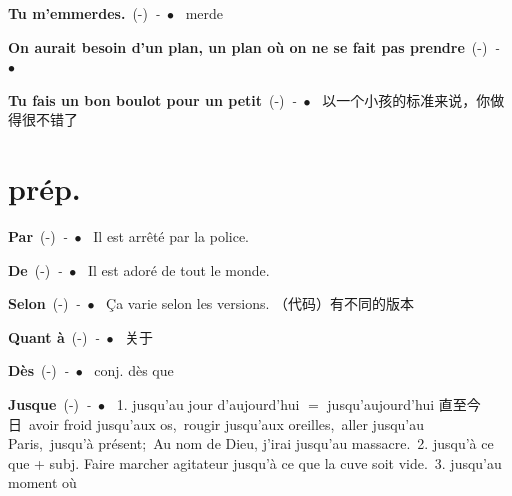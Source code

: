 \documentclass[10pt,a4paper,twoside]{article} %
\newcommand{\entry}[4]{\textbf{#1}\ {(#2)}\ \textit{#3}\ $\bullet$\ {#4}} %
\begin{document}
\begin{CJK*}{UTF8}{gkai}
\begin{multicols}{2}
\entry{Tu m'emmerdes.}{-}{-}
{
merde
}

\entry{On aurait besoin d'un plan, un plan o\`u on ne se fait pas prendre}{-}{-}
{
}

\entry{Tu fais un bon boulot pour un petit}{-}{-}
{
以一个小孩的标准来说，你做得很不错了
}

\end{multicols}


\section*{prép.}

\begin{multicols}{2}

\entry{Par}{-}{-}
{
Il est arrêté par la police.
}

\entry{De}{-}{-}
{
Il est adoré de tout le monde.
}

\entry{Selon}{-}{-}
{
Ça varie selon les versions. （代码）有不同的版本
}

\entry{Quant à}{-}{-}
{
关于
}

\entry{Dès}{-}{-}
{
conj. dès que 
}

\entry{Jusque}{-}{-}
{
1. jusqu'au jour d'aujourd'hui $=$ jusqu'aujourd'hui 直至今日\ 
avoir froid jusqu'aux os,\ rougir jusqu'aux oreilles,\ aller jusqu'au Paris,\ jusqu'à présent;\
Au nom de Dieu, j'irai jusqu'au massacre.\ 
2. jusqu'à ce que + subj. Faire marcher agitateur jusqu'à ce que la cuve soit vide.\ 
3. jusqu'au moment o\`u
}

\end{multicols}

\end{CJK*}
\end{document}
